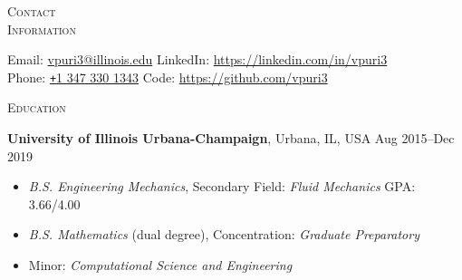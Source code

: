 \documentclass[10pt]{article}
\begin{document}
\begin{multicols}{2}
\textsc{\small Contact \\ Information}
\columnbreak

Email: \href{mailto:vpuri3@illinois.edu}{vpuri3@illinois.edu}
\hfill LinkedIn: \url{https://linkedin.com/in/vpuri3}\\
Phone: \href{tel:13473301343}{\texttt{+}1 347 330 1343}
\hfill Code:     \url{https://github.com/vpuri3}
 \end{multicols}
\vspace{-1.5em}
\begin{multicols}{2}
\textsc{\small Education}
\columnbreak

\textbf{University of Illinois Urbana-Champaign}, Urbana, IL, USA \hfill Aug 2015--Dec 2019

\vspace{-1.75em}
\begin{itemize}[label= ]
    \setlength\itemsep{-0.25em}
    \item {\sl B.S. Engineering Mechanics}, Secondary Field: {\sl Fluid Mechanics} \hfill GPA: 3.66/4.00
    \item {\sl B.S. Mathematics} (dual degree), Concentration: {\sl Graduate Preparatory}
    \item  Minor: {\sl Computational Science and Engineering}
\end{itemize}
\vspace{-2.0em}

\end{multicols}
\vspace{-1.5em}
\end{document}
